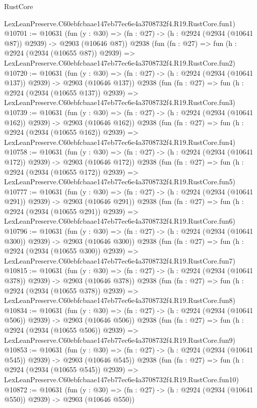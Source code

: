 \begin{lexlean}{RustCore}
\begin{coremodule}
    LexLeanPreserve.C60ebfcbaae147eb77ec6e4a3708732f4.R19.RustCore.fun1)
@10701 := @10631
    (fun (y : @30) => (fn : @27) -> (h : @2924 (@2934 (@10641 @87)) @2939) -> @2903 (@10646 @87))
    @2938
    (fun (fn : @27) =>
    fun (h : @2924 (@2934 (@10655 @87)) @2939) =>
    LexLeanPreserve.C60ebfcbaae147eb77ec6e4a3708732f4.R19.RustCore.fun2)
@10720 := @10631
    (fun (y : @30) => (fn : @27) -> (h : @2924 (@2934 (@10641 @137)) @2939) -> @2903 (@10646 @137))
    @2938
    (fun (fn : @27) =>
    fun (h : @2924 (@2934 (@10655 @137)) @2939) =>
    LexLeanPreserve.C60ebfcbaae147eb77ec6e4a3708732f4.R19.RustCore.fun3)
@10739 := @10631
    (fun (y : @30) => (fn : @27) -> (h : @2924 (@2934 (@10641 @162)) @2939) -> @2903 (@10646 @162))
    @2938
    (fun (fn : @27) =>
    fun (h : @2924 (@2934 (@10655 @162)) @2939) =>
    LexLeanPreserve.C60ebfcbaae147eb77ec6e4a3708732f4.R19.RustCore.fun4)
@10758 := @10631
    (fun (y : @30) => (fn : @27) -> (h : @2924 (@2934 (@10641 @172)) @2939) -> @2903 (@10646 @172))
    @2938
    (fun (fn : @27) =>
    fun (h : @2924 (@2934 (@10655 @172)) @2939) =>
    LexLeanPreserve.C60ebfcbaae147eb77ec6e4a3708732f4.R19.RustCore.fun5)
@10777 := @10631
    (fun (y : @30) => (fn : @27) -> (h : @2924 (@2934 (@10641 @291)) @2939) -> @2903 (@10646 @291))
    @2938
    (fun (fn : @27) =>
    fun (h : @2924 (@2934 (@10655 @291)) @2939) =>
    LexLeanPreserve.C60ebfcbaae147eb77ec6e4a3708732f4.R19.RustCore.fun6)
@10796 := @10631
    (fun (y : @30) => (fn : @27) -> (h : @2924 (@2934 (@10641 @300)) @2939) -> @2903 (@10646 @300))
    @2938
    (fun (fn : @27) =>
    fun (h : @2924 (@2934 (@10655 @300)) @2939) =>
    LexLeanPreserve.C60ebfcbaae147eb77ec6e4a3708732f4.R19.RustCore.fun7)
@10815 := @10631
    (fun (y : @30) => (fn : @27) -> (h : @2924 (@2934 (@10641 @378)) @2939) -> @2903 (@10646 @378))
    @2938
    (fun (fn : @27) =>
    fun (h : @2924 (@2934 (@10655 @378)) @2939) =>
    LexLeanPreserve.C60ebfcbaae147eb77ec6e4a3708732f4.R19.RustCore.fun8)
@10834 := @10631
    (fun (y : @30) => (fn : @27) -> (h : @2924 (@2934 (@10641 @506)) @2939) -> @2903 (@10646 @506))
    @2938
    (fun (fn : @27) =>
    fun (h : @2924 (@2934 (@10655 @506)) @2939) =>
    LexLeanPreserve.C60ebfcbaae147eb77ec6e4a3708732f4.R19.RustCore.fun9)
@10853 := @10631
    (fun (y : @30) => (fn : @27) -> (h : @2924 (@2934 (@10641 @545)) @2939) -> @2903 (@10646 @545))
    @2938
    (fun (fn : @27) =>
    fun (h : @2924 (@2934 (@10655 @545)) @2939) =>
    LexLeanPreserve.C60ebfcbaae147eb77ec6e4a3708732f4.R19.RustCore.fun10)
@10872 := @10631
    (fun (y : @30) => (fn : @27) -> (h : @2924 (@2934 (@10641 @550)) @2939) -> @2903 (@10646 @550))

\end{coremodule}
\end{lexlean}

